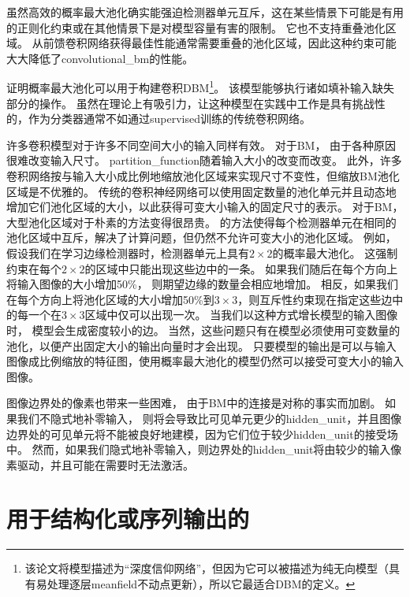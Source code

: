 虽然高效的概率最大池化确实能强迫检测器单元互斥，这在某些情景下可能是有用的正则化约束或在其他情景下是对模型容量有害的限制。
它也不支持重叠池化区域。
从前馈卷积网络获得最佳性能通常需要重叠的池化区域，因此这种约束可能大大降低了\gls{convolutional_bm}的性能。

\citet{HonglakL2009} 证明概率最大池化可以用于构建卷积\gls{DBM}\footnote{该论文将模型描述为``深度信仰网络''，但因为它可以被描述为纯无向模型（具有易处理逐层\gls{meanfield}不动点更新），所以它最适合\gls{DBM}的定义。}。
该模型能够执行诸如填补输入缺失部分的操作。
虽然在理论上有吸引力，让这种模型在实践中工作是具有挑战性的，作为分类器通常不如通过\gls{supervised}训练的传统卷积网络。


许多卷积模型对于许多不同空间大小的输入同样有效。
对于\gls{BM}， 由于各种原因很难改变输入尺寸。
\gls{partition_function}随着输入大小的改变而改变。
此外，许多卷积网络按与输入大小成比例地缩放池化区域来实现尺寸不变性，但缩放\gls{BM}池化区域是不优雅的。
传统的卷积神经网络可以使用固定数量的池化单元并且动态地增加它们池化区域的大小，以此获得可变大小输入的固定尺寸的表示。
对于\gls{BM}，大型池化区域对于朴素的方法变得很昂贵。
 \citet{HonglakL2009} 的方法使得每个检测器单元在相同的池化区域中互斥，解决了计算问题，但仍然不允许可变大小的池化区域。
例如，假设我们在学习边缘检测器时，检测器单元上具有$2 \times 2$的概率最大池化。
这强制约束在每个$2 \times 2$的区域中只能出现这些边中的一条。
如果我们随后在每个方向上将输入图像的大小增加50\%， 则期望边缘的数量会相应地增加。
相反，如果我们在每个方向上将池化区域的大小增加50\%到$3 \times 3 $，则互斥性约束现在指定这些边中的每一个在$3 \times3$区域中仅可以出现一次。
当我们以这种方式增长模型的输入图像时， 模型会生成密度较小的边。
当然，这些问题只有在模型必须使用可变数量的池化，以便产出固定大小的输出向量时才会出现。
只要模型的输出是可以与输入图像成比例缩放的特征图，使用概率最大池化的模型仍然可以接受可变大小的输入图像。

图像边界处的像素也带来一些困难， 由于\gls{BM}中的连接是对称的事实而加剧。
如果我们不隐式地补零输入， 则将会导致比可见单元更少的\gls{hidden_unit}，并且图像边界处的可见单元将不能被良好地建模，因为它们位于较少\gls{hidden_unit}的接受场中。
然而，如果我们隐式地补零输入，则边界处的\gls{hidden_unit}将由较少的输入像素驱动，并且可能在需要时无法激活。


\section{用于结构化或序列输出的}
\label{sec:boltzmann_machines_for_structured_or_sequential_outputs}

